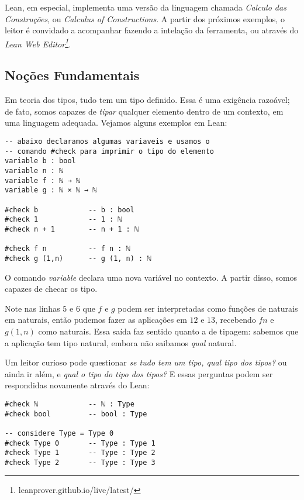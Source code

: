 Lean, em especial, implementa uma versão da linguagem chamada \textit{Calculo das Construções}, ou \textit{Calculus of Constructions}. A partir dos próximos exemplos, o leitor é convidado a acompanhar fazendo a intelação da ferramenta, ou através do \textit{Lean Web Editor\footnote{leanprover.github.io/live/latest/}}.

\subsection{Noções Fundamentais}
Em teoria dos tipos, tudo tem um tipo definido. Essa é uma exigência razoável; de fato, somos capazes de \textit{tipar} qualquer elemento dentro de um contexto, em uma linguagem adequada. Vejamos alguns exemplos em Lean:

\vspace{5mm}
\begin{lstlisting}
-- abaixo declaramos algumas variaveis e usamos o
-- comando #check para imprimir o tipo do elemento
variable b : bool
variable n : ℕ
variable f : ℕ → ℕ
variable g : ℕ × ℕ → ℕ

#check b            -- b : bool
#check 1            -- 1 : ℕ
#check n + 1        -- n + 1 : ℕ

#check f n          -- f n : ℕ
#check g (1,n)      -- g (1, n) : ℕ
\end{lstlisting}
\vspace{5mm}

\noindent O comando \textit{variable} declara uma nova variável no contexto.
A partir disso, somos capazes de checar os tipo.

Note nas linhas $5$ e $6$ que $f$ e $g$ podem ser interpretadas como funções de naturais em naturais, então pudemos fazer as aplicações em $12$ e $13$, recebendo $f n$ e $g (1,n)$ como naturais.
Essa saída faz sentido quanto a de tipagem: sabemos que a aplicação tem tipo natural, embora não saibamos \textit{qual} natural.

Um leitor curioso pode questionar \textit{se tudo tem um tipo, qual tipo dos tipos?} ou ainda ir além, e \textit{qual o tipo do tipo dos tipos?} E essas perguntas podem ser respondidas novamente através do Lean:

\vspace{5mm}
\begin{lstlisting}
#check ℕ            -- ℕ : Type
#check bool         -- bool : Type

-- considere Type = Type 0
#check Type 0       -- Type : Type 1
#check Type 1       -- Type : Type 2
#check Type 2       -- Type : Type 3
\end{lstlisting}
\vspace{5mm}

